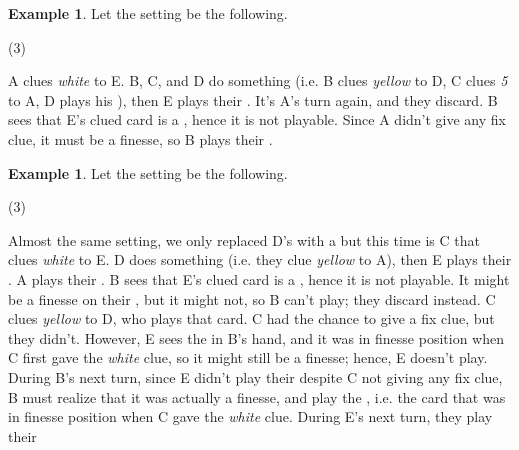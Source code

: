\documentclass[a4paper]{article}
\theoremstyle{plain}
\theoremstyle{definition}
\newtheorem{example}[theorem]{Example}
\begin{document}
\begin{example}
	
	Let the setting be the following.
	
	\begin{tasks}(3)
		\task[+]      
		\task[A]    
		\task[B]    
		\task[C]    
		\task[D]    
		\task[E]    
	\end{tasks}
	
	A clues \textit{white} to E. B, C, and D do something (i.e. B clues \textit{yellow} to D, C clues \textit{5} to A, D plays his ), then E plays their . It's A's turn again, and they discard. B sees that E's clued card is a , hence it is not playable. Since A didn't give any fix clue, it must be a finesse, so B plays their .
	
\end{example}

\begin{example}
	
	Let the setting be the following.
	
	\begin{tasks}(3)
		\task[+]      
		\task[A]    
		\task[B]    
		\task[C]    
		\task[D]    
		\task[E]    
	\end{tasks}
	
	Almost the same setting, we only replaced D's  with a  but this time is C that clues \textit{white} to E. D does something (i.e. they clue \textit{yellow} to A), then E plays their . A plays their . B sees that E's clued card is a , hence it is not playable. It might be a finesse on their , but it might not, so B can't play; they discard instead. C clues \textit{yellow} to D, who plays that card. C had the chance to give a fix clue, but they didn't. However, E sees the  in B's hand, and it was in finesse position when C first gave the \textit{white} clue, so it might still be a finesse; hence, E doesn't play. During B's next turn, since E didn't play their  despite C not giving any fix clue, B must realize that it was actually a finesse, and play the , i.e. the card that was in finesse position when C gave the \textit{white} clue. During E's next turn, they play their 
	
\end{example}
\end{document}
